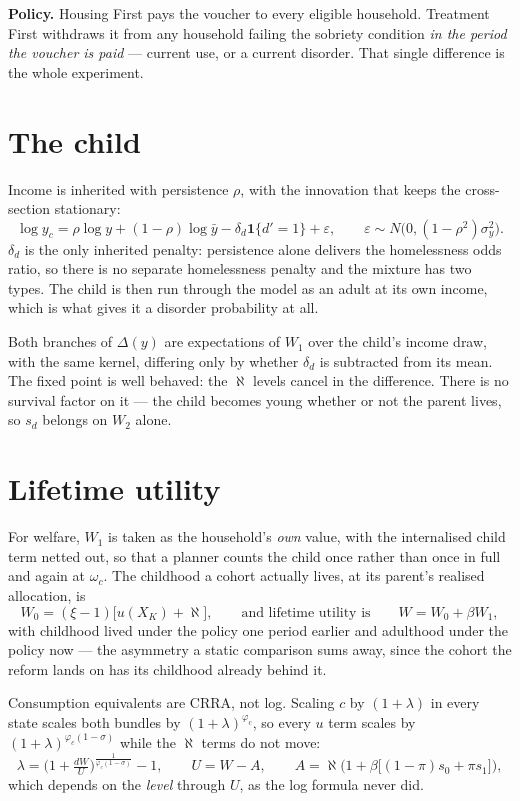 \documentclass[11pt]{article}
\begin{document}
\textbf{Policy.} Housing First pays the voucher to every eligible household.
Treatment First withdraws it from any household failing the sobriety condition
\emph{in the period the voucher is paid} --- current use, or a current disorder.
That single difference is the whole experiment.

\section*{The child}
Income is inherited with persistence $\rho$, with the innovation that keeps the
cross-section stationary:
\[
  \log y_c=\rho\log y+(1-\rho)\log\bar y-\delta_d\mathbf 1\{d'=1\}+\varepsilon,
  \qquad \varepsilon\sim N\!\big(0,(1-\rho^2)\sigma_y^2\big).
\]
$\delta_d$ is the only inherited penalty: persistence alone delivers the
homelessness odds ratio, so there is no separate homelessness penalty and the
mixture has two types. The child is then run through the model as an adult at its
own income, which is what gives it a disorder probability at all.

Both branches of $\Delta(y)$ are expectations of $W_1$ over the child's income
draw, with the same kernel, differing only by whether $\delta_d$ is subtracted
from its mean. The fixed point is well behaved: the $\aleph$ levels cancel in the
difference. There is no survival factor on it --- the child becomes young whether
or not the parent lives, so $s_d$ belongs on $W_2$ alone.

\section*{Lifetime utility}
For welfare, $W_1$ is taken as the household's \emph{own} value, with the
internalised child term netted out, so that a planner counts the child once
rather than once in full and again at $\omega_c$. The childhood a cohort actually
lives, at its parent's realised allocation, is
\[
  W_0=(\xi-1)\big[u(X_K)+\aleph\big],
  \qquad\text{and lifetime utility is}\qquad
  W=W_0+\beta W_1 ,
\]
with childhood lived under the policy one period earlier and adulthood under the
policy now --- the asymmetry a static comparison sums away, since the cohort the
reform lands on has its childhood already behind it.

Consumption equivalents are CRRA, not log. Scaling $c$ by $(1+\lambda)$ in every
state scales both bundles by $(1+\lambda)^{\varphi_c}$, so every $u$ term scales
by $(1+\lambda)^{\varphi_c(1-\sigma)}$ while the $\aleph$ terms do not move:
\[
  \lambda=\Big(1+\tfrac{dW}{U}\Big)^{\frac{1}{\varphi_c(1-\sigma)}}-1,
  \qquad U=W-A,\qquad A=\aleph\Big(1+\beta\big[(1-\pi)s_0+\pi s_1\big]\Big),
\]
which depends on the \emph{level} through $U$, as the log formula never did.
\end{document}
